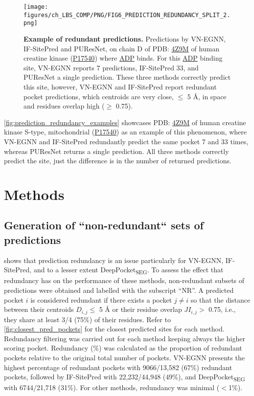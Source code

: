 \begin{figure}[htb!]
    \centering
    \texttt{[image: figures/ch\_LBS\_COMP/PNG/FIG6\_PREDICTION\_REDUNDANCY\_SPLIT\_2.png]}
    \caption[Example of redundant predictions]{\textbf{Example of redundant predictions.} Predictions by VN-EGNN, IF-SitePred and PUResNet, on chain D of PDB: \href{https://www.ebi.ac.uk/pdbe/entry/pdb/4z9m}{4Z9M} \cite{PDB_4Z9M} of human creatine kinase (\href{https://www.uniprot.org/uniprotkb/P17540/entry}{P17540}) where \href{https://www.ebi.ac.uk/pdbe-srv/pdbechem/chemicalCompound/show/ADP}{ADP} binds. For this \href{https://www.ebi.ac.uk/pdbe-srv/pdbechem/chemicalCompound/show/ADP}{ADP} binding site, VN-EGNN reports 7 predictions, IF-SitePred 33, and PUResNet a single prediction. These three methods correctly predict this site, however, VN-EGNN and IF-SitePred report redundant pocket predictions, which centroids are very close, $\leq$ 5 \AA{}, in space and residues overlap high ($\geq$ 0.75).}
    \label{fig:prediction_redundancy_examples}
\end{figure}

\autoref{fig:prediction_redundancy_examples} showcases PDB: \href{https://www.ebi.ac.uk/pdbe/entry/pdb/4z9m}{4Z9M} \cite{PDB_4Z9M} of human creatine kinase S-type, mitochondrial (\href{https://www.uniprot.org/uniprotkb/P17540/entry}{P17540}) as an example of this phenomenon, where VN-EGNN and IF-SitePred redundantly predict the same pocket 7 and 33 times, whereas PUResNet returns a single prediction. All three methods correctly predict the site, just the difference is in the number of returned predictions.

\section{Methods}

\subsection{Generation of ``non-redundant`` sets of predictions}

 shows that prediction redundancy is an issue particularly for VN-EGNN, IF-SitePred, and to a lesser extent DeepPocket\textsubscript{SEG}. To assess the effect that redundancy has on the performance of these methods, non-redundant subsets of predictions were obtained and labelled with the subscript ``NR''. A predicted pocket $i$ is considered redundant if there exists a pocket $j \neq i$ so that the distance between their centroids $D_{i,j} \leq$ 5 \AA{} or their residue overlap $JI_{i,j} >$ 0.75, i.e., they share at least 3/4 (75\%) of their residues. Refer to \autoref{fig:closest_pred_pockets} for the closest predicted sites for each method. Redundancy filtering was carried out for each method keeping always the higher scoring pocket. Redundancy (\%) was calculated as the proportion of redundant pockets relative to the original total number of pockets. VN-EGNN presents the highest percentage of redundant pockets with 9066/13,582 (67\%) redundant pockets, followed by IF-SitePred with 22,232/44,948 (49\%), and DeepPocket\textsubscript{SEG} with 6744/21,718 (31\%). For other methods, redundancy was minimal ($<$1\%).

